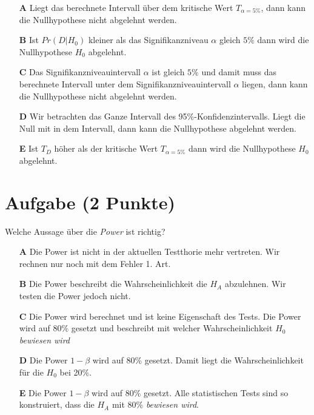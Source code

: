 \documentclass[a4paper, 9pt]{scrartcl}\usepackage[]{graphicx}\usepackage[]{xcolor}
\begin{document}
\begin{enumerate}
\item [\textbf{A} \msquare] Liegt das berechnete Intervall über dem kritische Wert $T_{\alpha = 5\%}$, dann kann die Nullhypothese nicht abgelehnt werden.
\item [\textbf{B} \msquare] Ist $Pr(D|H_0)$ kleiner als das Signifikanzniveau $\alpha$ gleich $5\%$ dann wird die Nullhypothese $H_0$ abgelehnt.
\item [\textbf{C} \msquare] Das Signifikanzniveauintervall $\alpha$ ist gleich $5\%$ und damit muss das berechnete Intervall unter dem Signifikanzniveauintervall $\alpha$ liegen, dann kann die Nullhypothese nicht abgelehnt werden.
\item [\textbf{D} \msquare] Wir betrachten das Ganze Intervall des 95\%-Konfidenzintervalls. Liegt die Null mit in dem Intervall, dann kann die Nullhypothese abgelehnt werden.
\item [\textbf{E} \msquare] Ist $T_{D}$ höher als der kritische Wert $T_{\alpha = 5\%}$ dann wird die Nullhypothese $H_0$ abgelehnt.
\end{enumerate}

\section{Aufgabe \hfill (2 Punkte)}

\ifcollection
\begin{flushright}
\tiny\vspace{-2Ex}
\textbf{\examinhaltstart}
\exammodulebiostat
\vspace{-1Ex}
\end{flushright}
\fi




Welche Aussage über die \textit{Power} ist richtig?



\begin{enumerate}
\item [\textbf{A} \msquare] Die Power ist nicht in der aktuellen Testthorie mehr vertreten. Wir rechnen nur noch mit dem Fehler 1. Art.
\item [\textbf{B} \msquare] Die Power beschreibt die Wahrscheinlichkeit die $H_A$ abzulehnen. Wir testen die Power jedoch nicht.
\item [\textbf{C} \msquare] Die Power wird berechnet und ist keine Eigenschaft des Tests. Die Power wird auf $80\%$ gesetzt und beschreibt mit welcher Wahrscheinlichkeit $H_0$ \textit{bewiesen wird}
\item [\textbf{D} \msquare] Die Power $1-\beta$ wird auf 80\% gesetzt. Damit liegt die Wahrscheinlichkeit für die $H_0$ bei 20\%.
\item [\textbf{E} \msquare] Die Power $1-\beta$ wird auf 80\% gesetzt. Alle statistischen Tests sind so konstruiert, dass die $H_A$ mit 80\% \textit{bewiesen wird}.
\end{enumerate}
\end{document}
